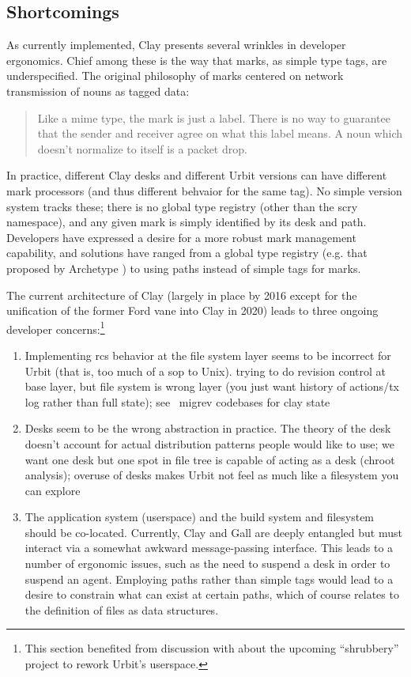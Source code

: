 \documentclass[twoside]{article}
\begin{document}
\subsection{Shortcomings}

As currently implemented, Clay presents several wrinkles in developer ergonomics.  Chief among these is the way that marks, as simple type tags, are underspecified.  The original philosophy of marks centered on network transmission of nouns as tagged data:

\begin{quote}
  Like a {\sc mime} type, the mark is just a label. There is no way to guarantee that the sender and receiver agree on what this label means.  A noun which doesn't normalize to itself is a packet drop.  \citep[pp. 51–52]{Whitepaper}
\end{quote}

\noindent
In practice, different Clay desks and different Urbit versions can have different mark processors (and thus different behvaior for the same tag).  No simple version system tracks these; there is no global type registry (other than the scry namespace), and any given mark is simply identified by its desk and path.  Developers have expressed a desire for a more robust mark management capability, and solutions have ranged from a global type registry (e.g. that proposed by Archetype \citep{TODO}) to using paths instead of simple tags for marks.

The current architecture of Clay (largely in place by 2016 except for the unification of the former Ford vane into Clay in 2020) leads to three ongoing developer concerns:\footnote{This section benefited from discussion with  about the upcoming ``shrubbery'' project to rework Urbit's userspace.}

\begin{enumerate}
  \item  Implementing {\sc rcs} behavior at the file system layer seems to be incorrect for Urbit (that is, too much of a sop to Unix).  trying to do revision control at base layer, but file system is wrong layer (you just want history of actions/tx log rather than full state); see ~migrev codebases for clay state
  \item  Desks seem to be the wrong abstraction in practice.  The theory of the desk doesn't account for actual distribution patterns people would like to use; we want one desk but one spot in file tree is capable of acting as a desk (chroot analysis); overuse of desks makes Urbit not feel as much like a filesystem you can explore
  \item  The application system (userspace) and the build system and filesystem should be co-located.  Currently, Clay and Gall are deeply entangled but must interact via a somewhat awkward message-passing interface.  This leads to a number of ergonomic issues, such as the need to suspend a desk in order to suspend an agent.  Employing paths rather than simple tags would lead to a desire to constrain what can exist at certain paths, which of course relates to the definition of files as data structures.
\end{enumerate}
\end{document}
